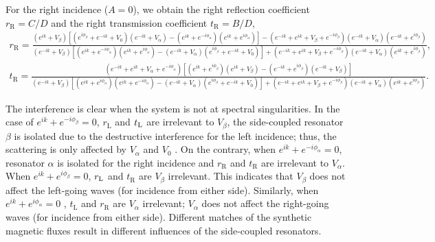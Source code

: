 \documentclass[prl,showpacs,superscriptaddress,twocolumn]{revtex4-1}
\begin{document}
\begin{widetext}
\begin{equation}
\label{L}
\end{equation}%
For the right incidence ($A=0$), we obtain the right reflection coefficient $%
r_{\mathrm{R}}=C/D$ and the right transmission coefficient $t_{\mathrm{R}%
}=B/D$,%
\begin{equation}
\begin{array}{l}
r_{\mathrm{R}}=\frac{\left( e^{ik}+V_{\beta }\right) \left[ \left( e^{i\phi
_{\beta }}+e^{-ik}+V_{0}\right) \left( e^{-ik}+V_{\alpha }\right) -\left(
e^{ik}+e^{-i\phi _{\alpha }}\right) \left( e^{ik}+e^{i\phi _{\alpha
}}\right) \right] -\left( e^{-ik}+e^{ik}+V_{\beta }+e^{-i\phi _{\beta
}}\right) \left( e^{-ik}+V_{\alpha }\right) \left( e^{-ik}+e^{i\phi _{\beta
}}\right) }{\left( e^{-ik}+V_{\beta }\right) \left[ \left( e^{ik}+e^{-i\phi
_{\alpha }}\right) \left( e^{ik}+e^{i\phi _{\alpha }}\right) -\left(
e^{-ik}+V_{\alpha }\right) \left( e^{i\phi _{\beta }}+e^{-ik}+V_{0}\right) %
\right] +\left( e^{-ik}+e^{ik}+V_{\beta }+e^{-i\phi _{\beta }}\right) \left(
e^{-ik}+V_{\alpha }\right) \left( e^{ik}+e^{i\phi _{\beta }}\right) }, \\
t_{\mathrm{R}}=\frac{\left( e^{-ik}+e^{ik}+V_{\alpha }+e^{-i\phi _{\alpha
}}\right) \left[ \left( e^{ik}+e^{i\phi _{\beta }}\right) \left(
e^{ik}+V_{\beta }\right) -\left( e^{-ik}+e^{i\phi _{\beta }}\right) \left(
e^{-ik}+V_{\beta }\right) \right] }{\left( e^{-ik}+V_{\beta }\right) \left[
\left( e^{ik}+e^{i\phi _{\alpha }}\right) \left( e^{ik}+e^{-i\phi _{\alpha
}}\right) -\left( e^{-ik}+V_{\alpha }\right) \left( e^{i\phi _{\beta
}}+e^{-ik}+V_{0}\right) \right] +\left( e^{-ik}+e^{ik}+V_{\beta }+e^{-i\phi
_{\beta }}\right) \left( e^{-ik}+V_{\alpha }\right) \left( e^{ik}+e^{i\phi
_{\beta }}\right) }.%
\end{array}
\label{R}
\end{equation}

The interference is clear when the system is not at spectral singularities.
In the case of $e^{ik}+e^{-i\phi _{\beta }}=0$, $r_{\mathrm{L}}$ and $t_{%
\mathrm{L}}$ are irrelevant to $V_{\beta }$, the side-coupled resonator $%
\beta $ is isolated due to the destructive interference for the left
incidence; thus, the scattering is only affected by $V_{\alpha }$ and $V_{0}$%
. On the contrary, when $e^{ik}+e^{-i\phi _{\alpha }}=0$, resonator $\alpha $
is isolated for the right incidence and $r_{\mathrm{R}}$ and $t_{\mathrm{R}}$
are irrelevant to $V_{\alpha }$. When $e^{ik}+e^{i\phi _{\beta }}=0$, $r_{%
\mathrm{L}}$ and $t_{\mathrm{R}}$ are $V_{\beta }$ irrelevant. This
indicates that $V_{\beta }$ does not affect the left-going waves (for
incidence from either side). Similarly, when $e^{ik}+e^{i\phi _{\alpha }}=0$%
, $t_{\mathrm{L}}$ and $r_{\mathrm{R}}$ are $V_{\alpha }$ irrelevant; $%
V_{\alpha }$ does not affect the right-going waves (for incidence from
either side). Different matches of the synthetic magnetic fluxes result in
different influences of the side-coupled resonators.


\end{widetext}
\end{document}
